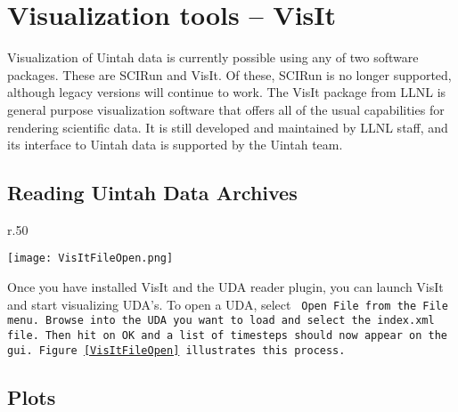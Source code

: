 \chapter{Visualization tools -- VisIt}

Visualization of Uintah data is currently possible using any of two
software packages.  These are SCIRun and VisIt.  Of these, SCIRun is
no longer supported, although legacy versions will continue to work.
The VisIt package from LLNL is general purpose visualization software
that offers all of the usual capabilities for rendering scientific
data.  It is still developed and maintained by LLNL staff, and its
interface to Uintah data is supported by the Uintah team.



\section{Reading Uintah Data Archives}

\begin{wrapfigure}{r}{.50\textwidth}
  \vspace{-30pt}
  \begin{center}
    \texttt{[image: VisItFileOpen.png]}
  \end{center}
  \vspace{-20pt}
  \caption{Opening an UDA with VisIt}
  \vspace{-10pt}
  \label{VisItFileOpen}
\end{wrapfigure}


Once you have installed VisIt and the UDA reader plugin, you can
launch VisIt and start visualizing UDA's. To open a UDA, select \tt
Open File \normalfont from the \tt File \normalfont menu. Browse into
the UDA you want to load and select the \tt index.xml \normalfont
file. Then hit on \tt OK \normalfont and a list of timesteps should
now appear on the gui. Figure~\ref{VisItFileOpen} illustrates this
process.


\section{Plots}

